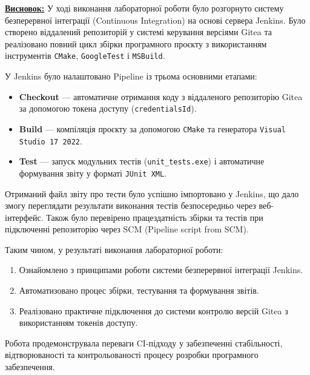 \documentclass[12pt,a4paper]{article}
\begin{document}
    \textbf{\underline{Висновок:}}
    У ході виконання лабораторної роботи було розгорнуто систему безперервної інтеграції (Continuous Integration) на основі сервера Jenkins. Було створено віддалений репозиторій у системі керування версіями Gitea та реалізовано повний цикл збірки програмного проєкту з використанням інструментів \texttt{CMake}, \texttt{GoogleTest} і \texttt{MSBuild}.

    У Jenkins було налаштовано Pipeline із трьома основними етапами:
    \begin{itemize}
        \item \textbf{Checkout} — автоматичне отримання коду з віддаленого репозиторію Gitea за допомогою токена доступу (\texttt{credentialsId}).
        \item \textbf{Build} — компіляція проєкту за допомогою \texttt{CMake} та генератора \texttt{Visual Studio 17 2022}.
        \item \textbf{Test} — запуск модульних тестів (\texttt{unit\_tests.exe}) і автоматичне формування звіту у форматі \texttt{JUnit XML}.
    \end{itemize}

    Отриманий файл звіту про тести було успішно імпортовано у Jenkins, що дало змогу переглядати результати виконання тестів безпосередньо через веб-інтерфейс. Також було перевірено працездатність збірки та тестів при підключенні репозиторію через SCM (Pipeline script from SCM).

    Таким чином, у результаті виконання лабораторної роботи:
    \begin{enumerate}
        \item Ознайомлено з принципами роботи системи безперервної інтеграції Jenkins.
        \item Автоматизовано процес збірки, тестування та формування звітів.
        \item Реалізовано практичне підключення до системи контролю версій Gitea з використанням токенів доступу.
    \end{enumerate}

    Робота продемонструвала переваги CI-підходу у забезпеченні стабільності, відтворюваності та контрольованості процесу розробки програмного забезпечення.
\end{document}

